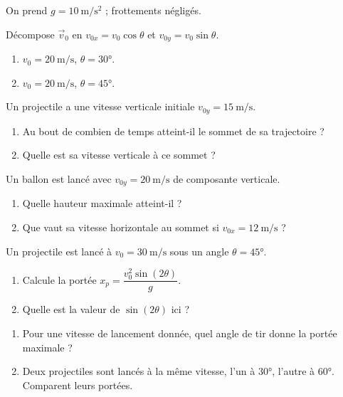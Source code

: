 \documentclass[11pt,a4paper]{article}
\newcommand{\vv}[1]{\vec{#1}}\newcommand{\ds}{\displaystyle}
\begin{document}
On prend $g=\qty{10}{\metre\per\second\squared}$ ; frottements négligés.

\begin{exo}
Décompose $\vv{v}_0$ en $v_{0x}=v_0\cos\theta$ et $v_{0y}=v_0\sin\theta$.
\begin{enumerate}[label=\alph*)]
  \item $v_0=\qty{20}{\metre\per\second}$, $\theta=\ang{30}$.
  \item $v_0=\qty{20}{\metre\per\second}$, $\theta=\ang{45}$.
\end{enumerate}
\end{exo}

\begin{exo}
Un projectile a une vitesse verticale initiale $v_{0y}=\qty{15}{\metre\per\second}$.
\begin{enumerate}[label=\alph*)]
  \item Au bout de combien de temps atteint-il le sommet de sa trajectoire ?
  \item Quelle est sa vitesse verticale à ce sommet ?
\end{enumerate}
\end{exo}

\begin{exo}
Un ballon est lancé avec $v_{0y}=\qty{20}{\metre\per\second}$ de composante verticale.
\begin{enumerate}[label=\alph*)]
  \item Quelle hauteur maximale atteint-il ?
  \item Que vaut sa vitesse horizontale au sommet si $v_{0x}=\qty{12}{\metre\per\second}$ ?
\end{enumerate}
\end{exo}

\begin{exo}
Un projectile est lancé à $v_0=\qty{30}{\metre\per\second}$ sous un angle $\theta=\ang{45}$.
\begin{enumerate}[label=\alph*)]
  \item Calcule la portée $x_p=\dfrac{v_0^2\sin(2\theta)}{g}$.
  \item Quelle est la valeur de $\sin(2\theta)$ ici ?
\end{enumerate}
\end{exo}

\begin{exo}
\begin{enumerate}[label=\alph*)]
  \item Pour une vitesse de lancement donnée, quel angle de tir donne la portée maximale ?
  \item Deux projectiles sont lancés à la même vitesse, l'un à \ang{30}, l'autre à \ang{60}. Comparent leurs portées.
\end{enumerate}
\end{exo}
\end{document}
